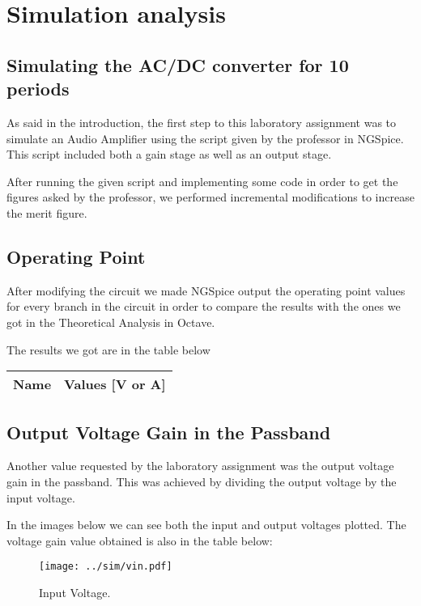 \section{Simulation analysis}
\label{sec:simulation}

\subsection{Simulating the AC/DC converter for 10 periods}
As said in the introduction, the first step to this laboratory assignment was to simulate an Audio Amplifier using the script given by the professor in NGSpice. This script included both a gain stage as well as an output stage.\par
After running the given script and implementing some code in order to get the figures asked by the professor, we performed incremental modifications to increase the merit figure.

\subsection{Operating Point}
After modifying the circuit we made NGSpice output the operating point values for every branch in the circuit in order to compare the results with the ones we got in the Theoretical Analysis in Octave. \par
The results we got are in the table below

\begin{table}[H]
  \centering
  \begin{tabular}{|l|r|}
    \hline    
    {\bf Name} & {\bf Values [V or A]} \\ \hline
    
  \end{tabular}
  \label{tab:op}
\end{table}

\subsection{Output Voltage Gain in the Passband}
Another value requested by the laboratory assignment was the output voltage gain in the passband. This was achieved by dividing the output voltage by the input voltage. \par
In the images below we can see both the input and output voltages plotted. The voltage gain value obtained is also in the table below:

\begin{figure}[H] \centering
\texttt{[image: ../sim/vin.pdf]}
\caption{Input Voltage.}
\label{fig:input}
\end{figure}

